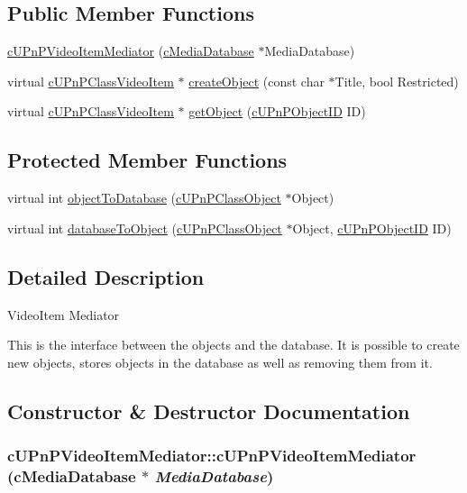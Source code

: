 \subsection*{Public Member Functions}
\begin{CompactItemize}
\item 
\hyperlink{classcUPnPVideoItemMediator_1f56334e155773b6c3d86f481f4ad96b}{cUPnPVideoItemMediator} (\hyperlink{classcMediaDatabase}{cMediaDatabase} $\ast$MediaDatabase)
\item 
virtual \hyperlink{classcUPnPClassVideoItem}{cUPnPClassVideoItem} $\ast$ \hyperlink{classcUPnPVideoItemMediator_27e001142c3651c36dfd3b7c450414c0}{createObject} (const char $\ast$Title, bool Restricted)
\item 
virtual \hyperlink{classcUPnPClassVideoItem}{cUPnPClassVideoItem} $\ast$ \hyperlink{classcUPnPVideoItemMediator_dd8927340a69d247965ef9250adefb21}{getObject} (\hyperlink{structcUPnPObjectID}{cUPnPObjectID} ID)
\end{CompactItemize}
\subsection*{Protected Member Functions}
\begin{CompactItemize}
\item 
virtual int \hyperlink{classcUPnPVideoItemMediator_984e10738bca46ce38307d5f60e26bd3}{objectToDatabase} (\hyperlink{classcUPnPClassObject}{cUPnPClassObject} $\ast$Object)
\item 
virtual int \hyperlink{classcUPnPVideoItemMediator_3f7ec1937b2b95e3ec5462470971d350}{databaseToObject} (\hyperlink{classcUPnPClassObject}{cUPnPClassObject} $\ast$Object, \hyperlink{structcUPnPObjectID}{cUPnPObjectID} ID)
\end{CompactItemize}


\subsection{Detailed Description}
VideoItem Mediator

This is the interface between the objects and the database. It is possible to create new objects, stores objects in the database as well as removing them from it. 

\subsection{Constructor \& Destructor Documentation}
\hypertarget{classcUPnPVideoItemMediator_1f56334e155773b6c3d86f481f4ad96b}{
\subsubsection[{cUPnPVideoItemMediator}]{\setlength{\rightskip}{0pt plus 5cm}cUPnPVideoItemMediator::cUPnPVideoItemMediator ({\bf cMediaDatabase} $\ast$ {\em MediaDatabase})}}
\label{classcUPnPVideoItemMediator_1f56334e155773b6c3d86f481f4ad96b}



